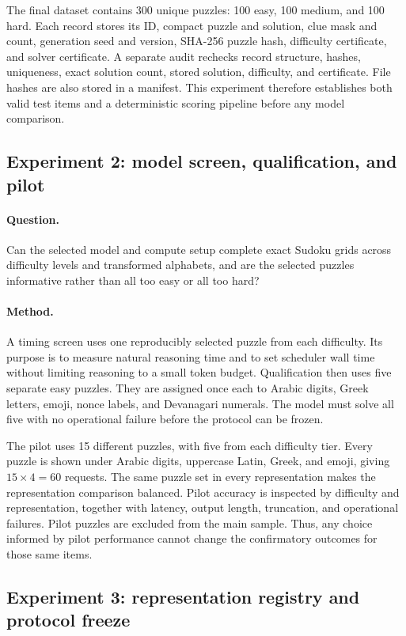 \documentclass[11pt,a4paper]{article}
\begin{document}
The final dataset contains 300 unique puzzles: 100 easy, 100 medium, and 100 hard.  Each record stores its ID, compact puzzle and solution, clue mask and count, generation seed and version, SHA-256 puzzle hash, difficulty certificate, and solver certificate.  A separate audit rechecks record structure, hashes, uniqueness, exact solution count, stored solution, difficulty, and certificate.  File hashes are also stored in a manifest.  This experiment therefore establishes both valid test items and a deterministic scoring pipeline before any model comparison.

\subsection{Experiment 2: model screen, qualification, and pilot}
\paragraph{Question.}
Can the selected model and compute setup complete exact Sudoku grids across difficulty levels and transformed alphabets, and are the selected puzzles informative rather than all too easy or all too hard?

\paragraph{Method.}
A timing screen uses one reproducibly selected puzzle from each difficulty.  Its purpose is to measure natural reasoning time and to set scheduler wall time without limiting reasoning to a small token budget.  Qualification then uses five separate easy puzzles.  They are assigned once each to Arabic digits, Greek letters, emoji, nonce labels, and Devanagari numerals.  The model must solve all five with no operational failure before the protocol can be frozen.

The pilot uses 15 different puzzles, with five from each difficulty tier.  Every puzzle is shown under Arabic digits, uppercase Latin, Greek, and emoji, giving $15\times4=60$ requests.  The same puzzle set in every representation makes the representation comparison balanced.  Pilot accuracy is inspected by difficulty and representation, together with latency, output length, truncation, and operational failures.  Pilot puzzles are excluded from the main sample.  Thus, any choice informed by pilot performance cannot change the confirmatory outcomes for those same items.

\subsection{Experiment 3: representation registry and protocol freeze}
\end{document}
